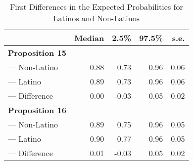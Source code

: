 \begin{table}[ht]
\centering
\begin{tabular}{lrrrr}
  \toprule
  & Median & 2.5\% & 97.5\% & s.e. \\ 
  \midrule 
 \textbf{ Proposition 15 } & \\
--- Non-Latino & 0.88 & 0.73 & 0.96 & 0.06 \\ 
  --- Latino & 0.89 & 0.73 & 0.96 & 0.06 \\ 
  --- Difference & 0.00 & -0.03 & 0.05 & 0.02 \\ 
   \midrule 
 \textbf{ Proposition 16 } & \\
--- Non-Latino & 0.89 & 0.75 & 0.96 & 0.05 \\ 
  --- Latino & 0.90 & 0.77 & 0.96 & 0.05 \\ 
  --- Difference & 0.01 & -0.03 & 0.05 & 0.02 \\ 
   \bottomrule
\end{tabular}
\caption{First Differences in the Expected Probabilities for Latinos and Non-Latinos} 
\label{tab:first_diff}
\end{table}
